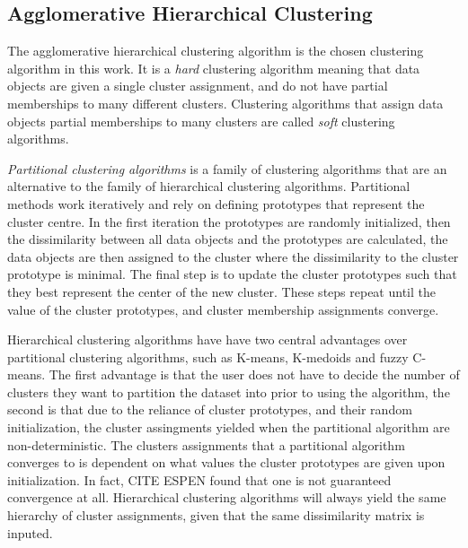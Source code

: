 \subsection{Agglomerative Hierarchical Clustering}

The agglomerative hierarchical clustering algorithm is the chosen clustering algorithm in this work. It is a \textit{hard} clustering algorithm meaning that data objects are given a single cluster assignment, and do not have partial memberships to many different clusters. Clustering algorithms that assign data objects partial memberships to many clusters are called \textit{soft} clustering algorithms. \bigskip

\textit{Partitional clustering algorithms} is a family of clustering algorithms that are an alternative to the family of hierarchical clustering algorithms. Partitional methods work iteratively and rely on defining prototypes that represent the cluster centre. In the first iteration the prototypes are randomly initialized, then the dissimilarity between all data objects and the prototypes are calculated, the data objects are then assigned to the cluster where the dissimilarity to the cluster prototype is minimal. The final step is to update the cluster prototypes such that they best represent the center of the new cluster. These steps repeat until the value of the cluster prototypes, and cluster membership assignments converge. \bigskip

Hierarchical clustering algorithms have have two central advantages over partitional clustering algorithms, such as K-means, K-medoids and fuzzy C-means. The first advantage is that the user does not have to decide the number of clusters they want to partition the dataset into prior to using the algorithm, the second is that due to the reliance of cluster prototypes, and their random initialization, the cluster assingments yielded when the partitional algorithm are non-deterministic. The clusters assignments that a partitional algorithm converges to is dependent on what values the cluster prototypes are given upon initialization. In fact, CITE ESPEN found that one is not guaranteed convergence at all. Hierarchical clustering algorithms will always yield the same hierarchy of cluster assignments, given that the same dissimilarity matrix is inputed. \bigskip

